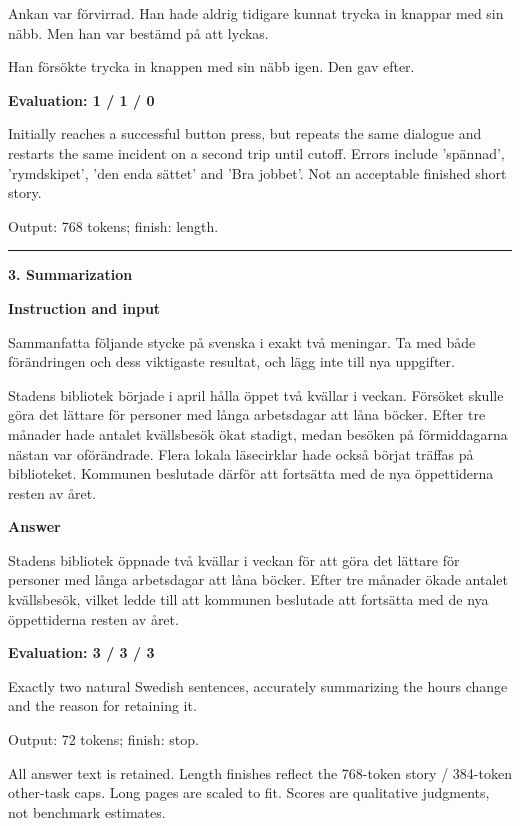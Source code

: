 \documentclass[10pt]{article}
\begin{document}
{\begin{minipage}{\textwidth}
\par\smallskip
Ankan var förvirrad. Han hade aldrig tidigare kunnat trycka in knappar med sin näbb. Men han var bestämd på att lyckas.
\par\smallskip
Han försökte trycka in knappen med sin näbb igen. Den gav efter.\par\smallskip
\textbf{Evaluation: 1 / 1 / 0}\par Initially reaches a successful button press, but repeats the same dialogue and restarts the same incident on a second trip until cutoff. Errors include 'spännad', 'rymdskipet', 'den enda sättet' and 'Bra jobbet'. Not an acceptable finished short story.
\par {\color{gray} Output: 768 tokens; finish: length.}\par
\medskip\hrule\smallskip
{\bfseries 3. Summarization}\par\smallskip
\textbf{Instruction and input}\par Sammanfatta följande stycke på svenska i exakt två meningar. Ta med både förändringen och dess viktigaste resultat, och lägg inte till nya uppgifter.
\par\smallskip
Stadens bibliotek började i april hålla öppet två kvällar i veckan. Försöket skulle göra det lättare för personer med långa arbetsdagar att låna böcker. Efter tre månader hade antalet kvällsbesök ökat stadigt, medan besöken på förmiddagarna nästan var oförändrade. Flera lokala läsecirklar hade också börjat träffas på biblioteket. Kommunen beslutade därför att fortsätta med de nya öppettiderna resten av året.\par\smallskip
\textbf{Answer}\par Stadens bibliotek öppnade två kvällar i veckan för att göra det lättare för personer med långa arbetsdagar att låna böcker. Efter tre månader ökade antalet kvällsbesök, vilket ledde till att kommunen beslutade att fortsätta med de nya öppettiderna resten av året.\par\smallskip
\textbf{Evaluation: 3 / 3 / 3}\par Exactly two natural Swedish sentences, accurately summarizing the hours change and the reason for retaining it.
\par {\color{gray} Output: 72 tokens; finish: stop.}\par
\medskip\footnotesize All answer text is retained. Length finishes reflect the 768-token story / 384-token other-task caps. Long pages are scaled to fit. Scores are qualitative judgments, not benchmark estimates.
\end{minipage}}%
\end{document}
